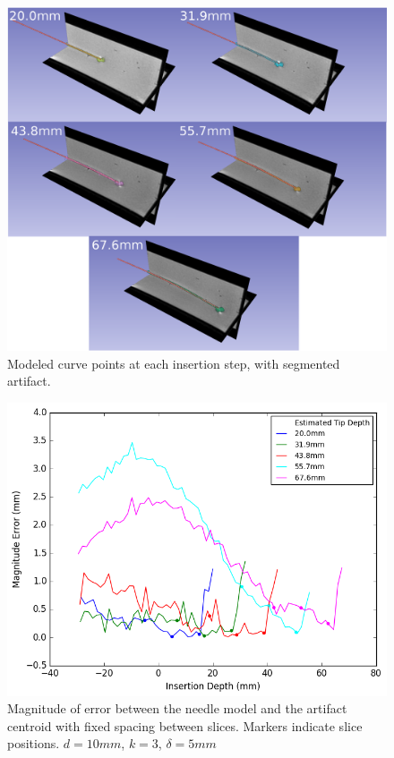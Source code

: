 \begin{figure}[h]
\includegraphics[width=1.0\textwidth]{Fig/chap5/insertions_labels.png}
\caption{Modeled curve points at each insertion step, with segmented artifact.}
\label{fig:curve_points}
\end{figure}

\begin{figure}[h]
\includegraphics[width=1.0\textwidth]{Fig/chap5/error_curve_3_10.png}
\caption{Magnitude of error between the needle model and the artifact centroid with fixed spacing between slices. Markers indicate slice positions. $d=10mm$, $k=3$, $\delta=5mm$}
\label{fig:curve_errors_fixed_spacing}
\end{figure}

